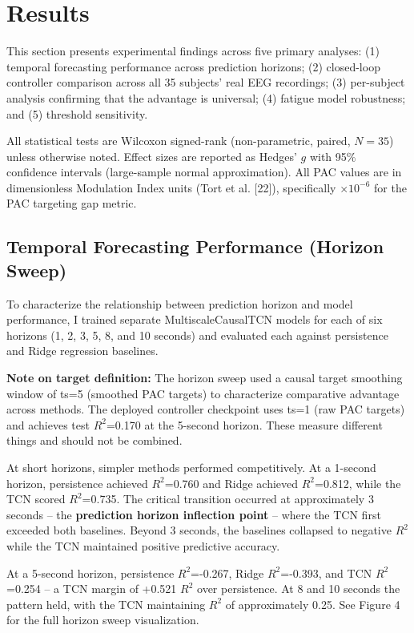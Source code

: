 \documentclass[11pt,letterpaper]{article}
\begin{document}
\section{Results}

This section presents experimental findings across five primary analyses: (1) temporal forecasting performance across prediction horizons; (2) closed-loop controller comparison across all 35 subjects' real EEG recordings; (3) per-subject analysis confirming that the advantage is universal; (4) fatigue model robustness; and (5) threshold sensitivity.

All statistical tests are Wilcoxon signed-rank (non-parametric, paired, $N = 35$) unless otherwise noted. Effect sizes are reported as Hedges' $g$ with 95\% confidence intervals (large-sample normal approximation). All PAC values are in dimensionless Modulation Index units (Tort et al. [22]), specifically $\times 10^{-6}$ for the PAC targeting gap metric.

\subsection{Temporal Forecasting Performance (Horizon Sweep)}

To characterize the relationship between prediction horizon and model performance, I trained separate MultiscaleCausalTCN models for each of six horizons (1, 2, 3, 5, 8, and 10 seconds) and evaluated each against persistence and Ridge regression baselines.

\textbf{Note on target definition:} The horizon sweep used a causal target smoothing window of ts=5 (smoothed PAC targets) to characterize comparative advantage across methods. The deployed controller checkpoint uses ts=1 (raw PAC targets) and achieves test $R^2$=0.170 at the 5-second horizon. These measure different things and should not be combined.

At short horizons, simpler methods performed competitively. At a 1-second horizon, persistence achieved $R^2$=0.760 and Ridge achieved $R^2$=0.812, while the TCN scored $R^2$=0.735. The critical transition occurred at approximately 3 seconds -- the \textbf{prediction horizon inflection point} -- where the TCN first exceeded both baselines. Beyond 3 seconds, the baselines collapsed to negative $R^2$ while the TCN maintained positive predictive accuracy.

At a 5-second horizon, persistence $R^2$=-0.267, Ridge $R^2$=-0.393, and TCN $R^2$=0.254 -- a TCN margin of +0.521 $R^2$ over persistence. At 8 and 10 seconds the pattern held, with the TCN maintaining $R^2$ of approximately 0.25. See Figure 4 for the full horizon sweep visualization.
\end{document}
